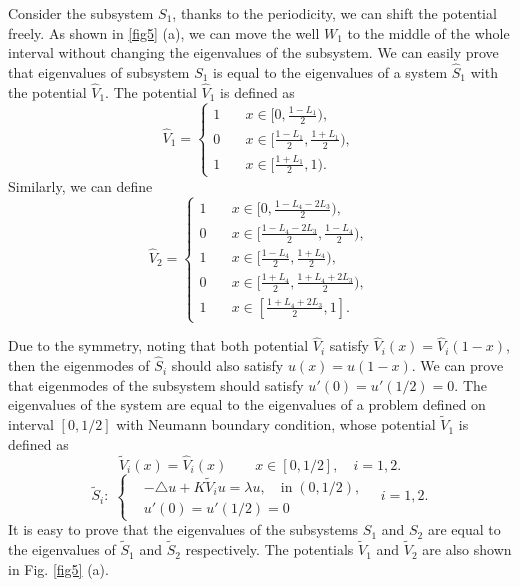 \documentclass[a4paper,11pt]{article}
\begin{document}
Consider the subsystem $S_1$, thanks to the periodicity, we can shift the potential freely. As shown in \ref{fig5} (a), we can move the well $W_1$ to the middle of the whole interval without changing the eigenvalues of the subsystem. We can easily prove that eigenvalues of subsystem $S_1$ is equal to the eigenvalues of a system $\hat{S}_1$ with the potential $\hat{V}_1$. The potential $\hat{V}_1$ is defined as
\begin{equation}
\hat{V}_1 = \left\{
\begin{split}
1 & \quad x \in [0, \frac{1 - L_1}{2}), \\
0 & \quad x \in [\frac{1 - L_1}{2}, \frac{1 + L_1}{2}), \\
1 & \quad x \in [\frac{1 + L_1}{2}, 1).
\end{split}
\right.
\end{equation}
Similarly, we can define
\begin{equation}
\hat{V}_2 = \left\{
\begin{split}
1 & \quad x \in [0, \frac{1 - L_4 - 2 L_3}{2}), \\
0 & \quad x \in [\frac{1 - L_4 - 2 L_3}{2}, \frac{1 - L_4}{2}), \\
1 & \quad x \in [\frac{1 - L_4}{2}, \frac{1 + L_4}{2}), \\
0 & \quad x \in [\frac{1 + L_4}{2}, \frac{1 + L_4 + 2 L_3}{2}), \\
1 & \quad x \in [\frac{1 + L_4 + 2 L_3}{2}, 1].
\end{split}
\right.
\end{equation}

Due to the symmetry, noting that both potential $\hat{V}_i$ satisfy $\hat{V}_i(x) = \hat{V}_i(1-x)$, then the eigenmodes of $\hat{S}_i$ should also satisfy $u(x) = u(1-x)$. We can prove that eigenmodes of the subsystem should satisfy $u'(0) = u'(1/2) = 0$. The eigenvalues of the system are equal to the eigenvalues of a problem defined on interval $[0, 1/2]$ with Neumann boundary condition, whose potential $\tilde{V}_1$ is defined as
\begin{equation}
\tilde{V}_i(x) = \hat{V}_i(x) \qquad x \in [0, 1/2], \quad i = 1, 2.
\end{equation}
\begin{equation}
\tilde{S}_i: \;
\left\{
\begin{split}
& -\triangle u + K \tilde{V}_i u = \lambda u, \quad \textrm{in} \; (0, 1/2), \\
& u'(0) = u'(1/2) = 0
\end{split}
\right.
\quad
i = 1, 2.
\end{equation}
It is easy to prove that the eigenvalues of the subsystems $S_1$ and $S_2$ are equal to the eigenvalues of $\tilde{S}_1$ and $\tilde{S}_2$ respectively. The potentials $\tilde{V}_1$ and $\tilde{V}_2$ are also shown in Fig. \ref{fig5} (a).
\end{document}
